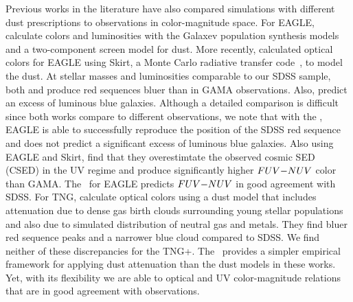 Previous works in the literature have also compared simulations with different
dust prescriptions to observations in color-magnitude space. For EAGLE, 
\cite{trayford2015} calculate colors and luminosities with the {\sc Galaxev}
population synthesis models and a two-component screen model for dust. More
recently, \cite{trayford2017} calculated optical colors for EAGLE using {\sc
Skirt}, a Monte Carlo radiative transfer code~\citep{camps2015}, to model the
dust. At stellar masses and luminosities comparable to our SDSS sample, both 
\cite{trayford2015} and \cite{trayford2017} produce red sequences bluer than 
in GAMA observations. Also, \cite{trayford2015} predict an excess of luminous 
blue galaxies. Although a detailed comparison is difficult since both works 
compare to different observations, we note that with the \eda, EAGLE is able 
to successfully reproduce the position of the SDSS red sequence and does not 
predict a significant excess of luminous blue galaxies. Also using EAGLE and 
{\sc Skirt}, \cite{baes2019} find that they overestimtate the observed cosmic 
SED (CSED) in the UV regime and produce significantly higher $FUV{-}NUV$ color 
than GAMA. The \eda~for EAGLE predicts $FUV{-}NUV$ in good agreement with SDSS. 
For TNG, \cite{nelson2018} calculate optical colors using a dust model that
includes attenuation due to dense gas birth clouds surrounding young stellar
populations and also due to simulated distribution of neutral gas and metals.
They find bluer red sequence peaks and a narrower blue cloud compared to SDSS.
We find neither of these discrepancies for the TNG+\eda. The \eda~provides a
simpler empirical framework for applying dust attenuation than the dust models
in these works. Yet, with its flexibility  we are able to 
optical and
UV color-magnitude relations that are in good agreement with observations.

 

 



